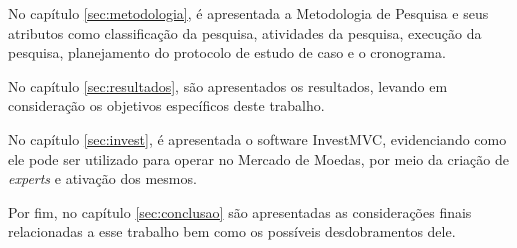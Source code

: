 No capítulo \ref{sec:metodologia}, é apresentada a Metodologia de Pesquisa e seus atributos como classificação da pesquisa, atividades da pesquisa, execução da pesquisa, planejamento do protocolo de estudo de caso e o cronograma.

No capítulo \ref{sec:resultados}, são apresentados os resultados, levando em consideração os objetivos específicos deste trabalho.

No capítulo \ref{sec:invest}, é apresentada o software InvestMVC, evidenciando como ele pode ser utilizado para operar no Mercado de Moedas, por meio da criação de \textit{experts} e ativação dos mesmos.

Por fim, no capítulo \ref{sec:conclusao} são apresentadas as considerações finais relacionadas a esse trabalho bem como os possíveis desdobramentos dele.